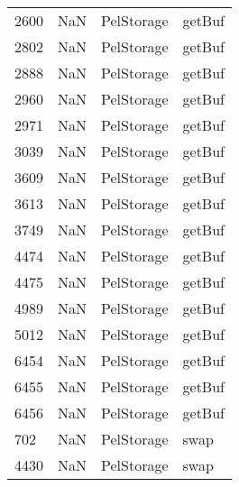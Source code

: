 \begin{tabular}{llll}
2600 &                   NaN &                 PelStorage &                                    getBuf \\
2802 &                   NaN &                 PelStorage &                                    getBuf \\
2888 &                   NaN &                 PelStorage &                                    getBuf \\
2960 &                   NaN &                 PelStorage &                                    getBuf \\
2971 &                   NaN &                 PelStorage &                                    getBuf \\
3039 &                   NaN &                 PelStorage &                                    getBuf \\
3609 &                   NaN &                 PelStorage &                                    getBuf \\
3613 &                   NaN &                 PelStorage &                                    getBuf \\
3749 &                   NaN &                 PelStorage &                                    getBuf \\
4474 &                   NaN &                 PelStorage &                                    getBuf \\
4475 &                   NaN &                 PelStorage &                                    getBuf \\
4989 &                   NaN &                 PelStorage &                                    getBuf \\
5012 &                   NaN &                 PelStorage &                                    getBuf \\
6454 &                   NaN &                 PelStorage &                                    getBuf \\
6455 &                   NaN &                 PelStorage &                                    getBuf \\
6456 &                   NaN &                 PelStorage &                                    getBuf \\
702  &                   NaN &                 PelStorage &                                      swap \\
4430 &                   NaN &                 PelStorage &                                      swap \\

\end{tabular}
